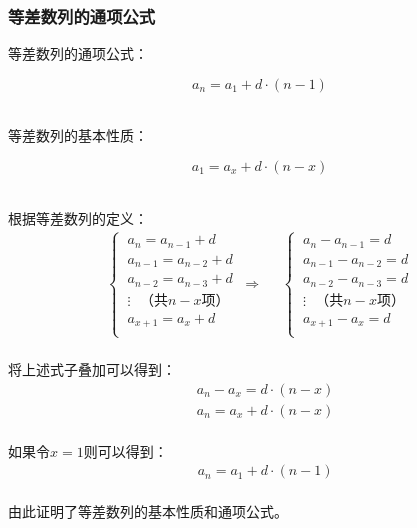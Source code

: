 \documentclass[UTF8]{ctexart}
\begin{document}
\subsubsection{等差数列的通项公式}
    \setcounter{equation}{0}
    等差数列的通项公式：
    \begin{large}
        \begin{equation*}
            a_n=a_1+d\cdot(n-1)
        \end{equation*}
    \end{large}\\
    等差数列的基本性质：
    \begin{large}
        \begin{equation*}
            a_1=a_x+d\cdot(n-x)
        \end{equation*}
    \end{large}\\
    根据等差数列的定义：
    \begin{align}
        \begin{cases}
            ~a_{n}=a_{n-1}+d\\[3mm]
            ~a_{n-1}=a_{n-2}+d\\[3mm]
            ~a_{n-2}=a_{n-3}+d\\[3mm]
            ~\vdots~~~\text{（共$n-x$项）}\\[3mm]
            ~a_{x+1}=a_{x}+d\\[1mm]
        \end{cases}~\Longrightarrow~~~~~~
        \begin{cases}
            ~a_{n}-a_{n-1}=d\\[3mm]
            ~a_{n-1}-a_{n-2}=d\\[3mm]
            ~a_{n-2}-a_{n-3}=d\\[3mm]
            ~\vdots~~~\text{（共$n-x$项）}\\[3mm]
            ~a_{x+1}-a_{x}=d\\[1mm]
        \end{cases}
    \end{align}\\
    将上述式子叠加可以得到：
    \begin{align}
        &a_n-a_x=d\cdot(n-x)\\[3mm]
        &a_n=a_x+d\cdot(n-x)
    \end{align}\\
    如果令$x=1$则可以得到：
    \begin{align}
        &a_n=a_1+d\cdot(n-1)
    \end{align}\\
    由此证明了等差数列的基本性质和通项公式。
\end{document}
